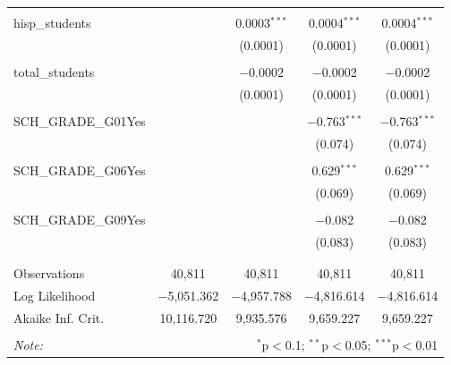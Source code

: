 \begin{table}[!htbp]
\begin{tabular}{@{\extracolsep{-2pt}}lcccc}
  & & & & \\ 
 hisp\_students &  & 0.0003$^{***}$ & 0.0004$^{***}$ & 0.0004$^{***}$ \\ 
  &  & (0.0001) & (0.0001) & (0.0001) \\ 
  & & & & \\ 
 total\_students &  & $-$0.0002 & $-$0.0002 & $-$0.0002 \\ 
  &  & (0.0001) & (0.0001) & (0.0001) \\ 
  & & & & \\ 
 SCH\_GRADE\_G01Yes &  &  & $-$0.763$^{***}$ & $-$0.763$^{***}$ \\ 
  &  &  & (0.074) & (0.074) \\ 
  & & & & \\ 
 SCH\_GRADE\_G06Yes &  &  & 0.629$^{***}$ & 0.629$^{***}$ \\ 
  &  &  & (0.069) & (0.069) \\ 
  & & & & \\ 
 SCH\_GRADE\_G09Yes &  &  & $-$0.082 & $-$0.082 \\ 
  &  &  & (0.083) & (0.083) \\ 
  & & & & \\ 
\hline \\[-1.8ex] 
Observations & 40,811 & 40,811 & 40,811 & 40,811 \\ 
Log Likelihood & $-$5,051.362 & $-$4,957.788 & $-$4,816.614 & $-$4,816.614 \\ 
Akaike Inf. Crit. & 10,116.720 & 9,935.576 & 9,659.227 & 9,659.227 \\ 
\hline 
\hline \\[-1.8ex] 
\textit{Note:}  & \multicolumn{4}{r}{$^{*}$p$<$0.1; $^{**}$p$<$0.05; $^{***}$p$<$0.01} \\ 
\end{tabular} 
\end{table} 
